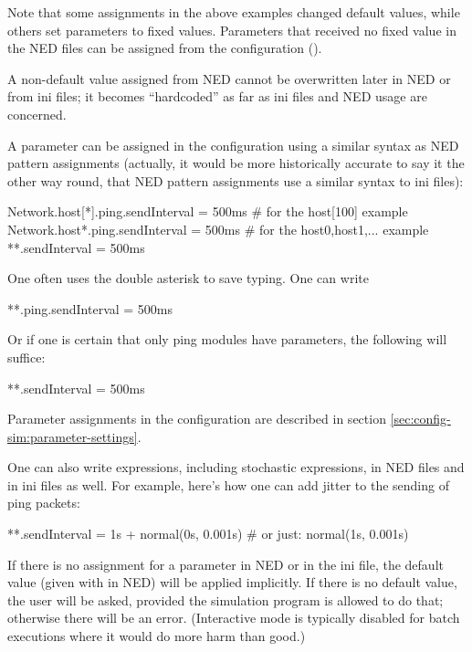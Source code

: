 Note that some assignments in the above examples changed default values, while
others set parameters to fixed values. Parameters that received no fixed value
in the NED files can be assigned from the configuration
().

\begin{important}
    A non-default value assigned from NED cannot be overwritten later in NED or
    from ini files; it becomes ``hardcoded'' as far as ini files and NED usage are
    concerned.
\end{important}

A parameter can be assigned in the configuration using a similar syntax as NED
pattern assignments (actually, it would be more historically accurate to say it
the other way round, that NED pattern assignments use a similar syntax to ini
files):


\begin{inifile}
Network.host[*].ping.sendInterval = 500ms  # for the host[100] example
Network.host*.ping.sendInterval = 500ms    # for the host0,host1,... example
**.sendInterval = 500ms
\end{inifile}

One often uses the double asterisk to save typing. One can write

\begin{inifile}
**.ping.sendInterval = 500ms
\end{inifile}

Or if one is certain that only ping modules have  parameters,
the following will suffice:

\begin{inifile}
**.sendInterval = 500ms
\end{inifile}

Parameter assignments in the configuration are described in section
\ref{sec:config-sim:parameter-settings}.

One can also write expressions, including stochastic expressions, in NED files
and in ini files as well. For example, here's how one can add jitter to the
sending of ping packets:

\begin{inifile}
**.sendInterval = 1s + normal(0s, 0.001s)  # or just: normal(1s, 0.001s)
\end{inifile}

If there is no assignment for a parameter in NED or in the ini file, the default
value (given with  in NED) will be applied implicitly. If
there is no default value, the user will be asked, provided the simulation
program is allowed to do that; otherwise there will be an error. (Interactive
mode is typically disabled for batch executions where it would do more harm than
good.)

